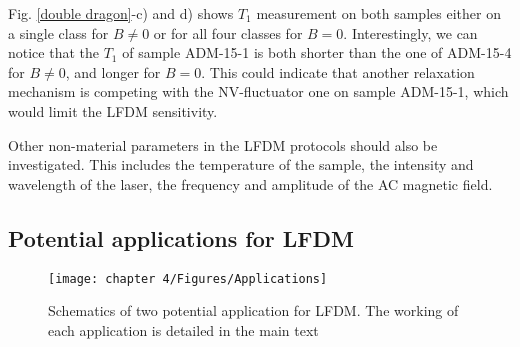 \documentclass[a4paper, 11pt]{book}
\begin{document}
Fig. \ref{double dragon}-c) and d) shows $T_1$ measurement on both samples either on a single class for $B\neq 0$ or for all four classes for $B=0$. Interestingly, we can notice that the $T_1$ of sample ADM-15-1 is both shorter than the one of ADM-15-4 for $B\neq 0$, and longer for $B=0$. This could indicate that another relaxation mechanism is competing with the NV-fluctuator one on sample ADM-15-1, which would limit the LFDM sensitivity.

%
%

Other non-material parameters in the LFDM protocols should also be investigated. This includes the temperature of the sample, the intensity and wavelength of the laser, the frequency and amplitude of the AC magnetic field. 


\subsection{Potential applications for LFDM}

\begin{figure}[h!]
\centering
\texttt{[image: chapter 4/Figures/Applications]}
\caption{Schematics of two potential application for LFDM. The working of each application is detailed in the main text}
\label{applications}
\end{figure}
\end{document}
